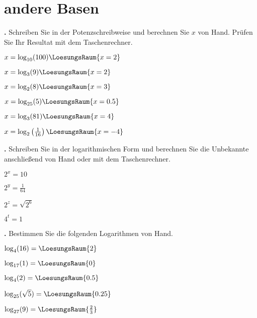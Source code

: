 \newpage
\section{andere Basen}

\textbf{\bbwAufgabenNummer{}.}
Schreiben Sie in der Potenzschreibweise und berechnen Sie $x$ von
Hand.
Prüfen Sie Ihr Resultat mit dem Taschenrechner.


\begin{bbwAufgabenBlock}
\item $x = \log_{10}(100)  \LoesungsRaum{x=2}$
\item $x = \log_3(9)  \LoesungsRaum{x=2}$
\item $x = \log_2(8)  \LoesungsRaum{x=3}$
\item $x = \log_{25}(5)  \LoesungsRaum{x=0.5}$
\item $x = \log_3(81)  \LoesungsRaum{x=4}$
\item $x = \log_2\left(\frac1{16}\right)  \LoesungsRaum{x=-4}$
\end{bbwAufgabenBlock}

\newpage

\textbf{\bbwAufgabenNummer{}.}
Schreiben Sie in der logarithmischen Form und berechnen Sie die
Unbekannte anschließend von Hand oder mit dem Taschenrechner.

\begin{bbwAufgabenBlock}
\item $2^x = 10$   
\item $2^y = \frac{1}{64}$   
\item $2^z = \sqrt{2^6}$   
\item $4^t= 1$   
\end{bbwAufgabenBlock}



\newpage

\textbf{\bbwAufgabenNummer{}.}
Bestimmen Sie die folgenden Logarithmen von Hand.

\begin{bbwAufgabenBlock}
\item $\log_4(16)     =    \LoesungsRaum{2}$
\item $\log_{17}(1)     =    \LoesungsRaum{0}$
\item $\log_4(2)     =    \LoesungsRaum{0.5}$
\item $\log_{25}(\sqrt{5})     =    \LoesungsRaum{0.25}$
\item $\log_{27}(9)     =    \LoesungsRaum{\frac23}$
\end{bbwAufgabenBlock}


